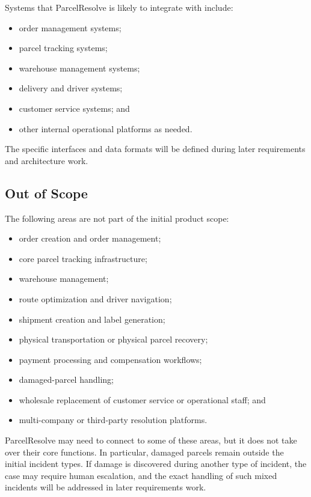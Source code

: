 \documentclass[11pt,a4paper]{article}
\begin{document}
Systems that ParcelResolve is likely to integrate with include:

\begin{itemize}
    \item order management systems;
    \item parcel tracking systems;
    \item warehouse management systems;
    \item delivery and driver systems;
    \item customer service systems; and
    \item other internal operational platforms as needed.
\end{itemize}

The specific interfaces and data formats will be defined during
later requirements and architecture work.


\subsection{Out of Scope}

The following areas are not part of the initial product scope:

\begin{itemize}
    \item order creation and order management;
    \item core parcel tracking infrastructure;
    \item warehouse management;
    \item route optimization and driver navigation;
    \item shipment creation and label generation;
    \item physical transportation or physical parcel recovery;
    \item payment processing and compensation workflows;
    \item damaged-parcel handling;
    \item wholesale replacement of customer service or operational
    staff; and
    \item multi-company or third-party resolution platforms.
\end{itemize}

ParcelResolve may need to connect to some of these areas, but it
does not take over their core functions. In particular, damaged
parcels remain outside the initial incident types. If damage is
discovered during another type of incident, the case may require
human escalation, and the exact handling of such mixed incidents
will be addressed in later requirements work.
\end{document}
